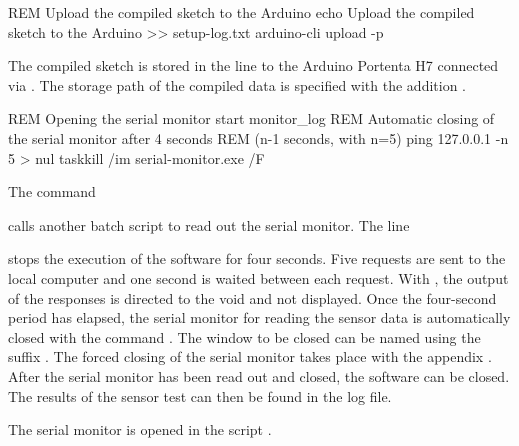\medskip


\begin{PowerShell}
REM Upload the compiled sketch to the Arduino
echo Upload the compiled sketch to the Arduino >> setup-log.txt
arduino-cli upload -p %
\end{PowerShell}

\medskip


The compiled sketch is stored in the line    to the Arduino Portenta H7 connected via . The storage path of the compiled data is specified with the addition .

\medskip


\begin{PowerShell}
REM Opening the serial monitor
start monitor_log
REM Automatic closing of the serial monitor after 4 seconds 
REM (n-1 seconds, with n=5)
ping 127.0.0.1 -n 5 > nul
taskkill /im serial-monitor.exe /F
\end{PowerShell}

\medskip


The command 

\medskip


\medskip

calls another batch script to read out the serial monitor. The line 

\medskip


\medskip

stops the execution of the software for four seconds. Five requests are sent to the local computer and one second is waited between each request. With , the output of the responses is directed to the void and not displayed. Once the four-second period has elapsed, the serial monitor for reading the sensor data is automatically closed with the command . The window to be closed can be named  using the suffix . The forced closing of the serial monitor takes place with the appendix . After the serial monitor has been read out and closed, the software can be closed. The results of the sensor test can then be found in the log file.

The serial monitor is opened in the script .


